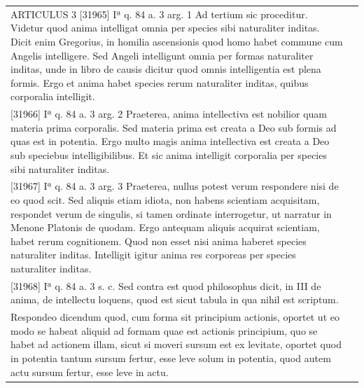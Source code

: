 \documentclass[paper=a4paper,fontsize=10pt,jafontsize=9pt,titlepage]{jlreq}
\begin{document}
\begin{longtable}{p{21em}p{21em}}
ARTICULUS 3
[31965] Iª q. 84 a. 3 arg. 1
Ad tertium sic proceditur. Videtur quod anima intelligat omnia per species sibi naturaliter inditas. Dicit enim Gregorius, in homilia ascensionis quod homo habet commune cum Angelis intelligere. Sed Angeli intelligunt omnia per formas naturaliter inditas, unde in libro de causis dicitur quod omnis intelligentia est plena formis. Ergo et anima habet species rerum naturaliter inditas, quibus corporalia intelligit.


 
&

\\[1em]



 
[31966] Iª q. 84 a. 3 arg. 2
 Praeterea, anima intellectiva est nobilior quam materia prima corporalis. Sed materia prima est creata a Deo sub formis ad quas est in potentia. Ergo multo magis anima intellectiva est creata a Deo sub speciebus intelligibilibus. Et sic anima intelligit corporalia per species sibi naturaliter inditas.

 
 
&

\\[1em]




[31967] Iª q. 84 a. 3 arg. 3
 Praeterea, nullus potest verum respondere nisi de eo quod scit. Sed aliquis etiam idiota, non habens scientiam acquisitam, respondet verum de singulis, si tamen ordinate interrogetur, ut narratur in Menone Platonis de quodam. Ergo antequam aliquis acquirat scientiam, habet rerum cognitionem. Quod non esset nisi anima haberet species naturaliter inditas. Intelligit igitur anima res corporeas per species naturaliter inditas.

 
 
&

\\[1em]




[31968] Iª q. 84 a. 3 s. c.
 Sed contra est quod philosophus dicit, in III de anima, de intellectu loquens, quod est sicut tabula in qua nihil est scriptum.

 
 
&

\\[1em]

 Respondeo dicendum quod, cum forma sit principium actionis, oportet ut eo modo
 se habeat aliquid ad formam quae est actionis principium, quo se habet ad
 actionem illam, sicut si moveri sursum est ex levitate, oportet quod in
 potentia tantum sursum fertur, esse leve solum in potentia, quod autem actu
 sursum fertur, esse leve in actu.


\end{longtable}
\end{document}
